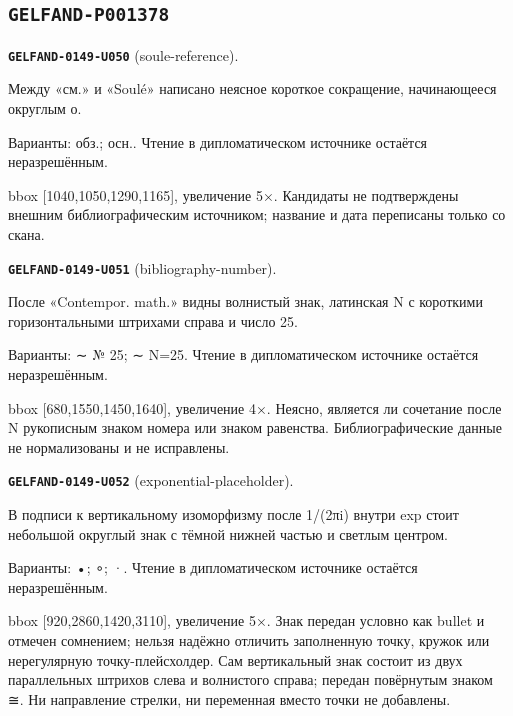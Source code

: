 \documentclass[11pt]{article}
\theoremstyle{definition}
\theoremstyle{remark}
\begin{document}
\subsection*{\texttt{GELFAND-P001378}}
\noindent\leavevmode{}\label{GELFAND-P001378:soule-reference:note}\textbf{\texttt{GELFAND-0149-U050}} (soule-reference).\par\nopagebreak[4]
Между «см.» и «Soulé» написано неясное короткое сокращение, начинающееся округлым о.\par
Варианты: обз.; осн.. Чтение в дипломатическом источнике остаётся неразрешённым.\par
bbox [1040,1050,1290,1165], увеличение 5×. Кандидаты не подтверждены внешним библиографическим источником; название и дата переписаны только со скана.\par\medskip
\noindent\leavevmode{}\label{GELFAND-P001378:bibliography-number:note}\textbf{\texttt{GELFAND-0149-U051}} (bibliography-number).\par\nopagebreak[4]
После «Contempor. math.» видны волнистый знак, латинская N с короткими горизонтальными штрихами справа и число 25.\par
Варианты: ∼ № 25; ∼ N=25. Чтение в дипломатическом источнике остаётся неразрешённым.\par
bbox [680,1550,1450,1640], увеличение 4×. Неясно, является ли сочетание после N рукописным знаком номера или знаком равенства. Библиографические данные не нормализованы и не исправлены.\par\medskip
\noindent\leavevmode{}\label{GELFAND-P001378:exponential-placeholder:note}\textbf{\texttt{GELFAND-0149-U052}} (exponential-placeholder).\par\nopagebreak[4]
В подписи к вертикальному изоморфизму после 1/(2πi) внутри exp стоит небольшой округлый знак с тёмной нижней частью и светлым центром.\par
Варианты: •; ∘; ·. Чтение в дипломатическом источнике остаётся неразрешённым.\par
bbox [920,2860,1420,3110], увеличение 5×. Знак передан условно как bullet и отмечен сомнением; нельзя надёжно отличить заполненную точку, кружок или нерегулярную точку-плейсхолдер. Сам вертикальный знак состоит из двух параллельных штрихов слева и волнистого справа; передан повёрнутым знаком ≅. Ни направление стрелки, ни переменная вместо точки не добавлены.\par\medskip
\end{document}
